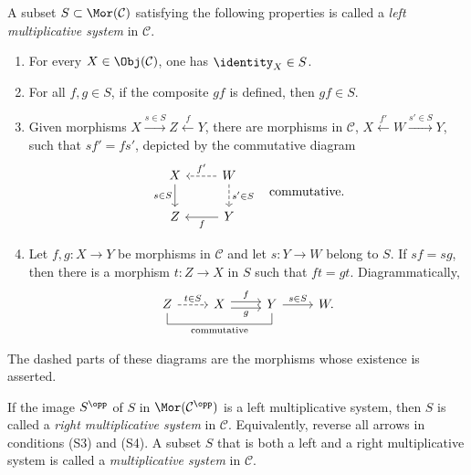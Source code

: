 \begin{definition}\label{def:multiplicative-family}
	A subset $S\subset\Mor(\mathcal{C})$ satisfying the following properties
	is called a \emph{left multiplicative system} in $\mathcal{C}$.
	\begin{enumerate}[(S1)]
		\item For every $X\in\Obj(\mathcal{C})$, one has $\identity_X\in S$.
		\item For all $f,g\in S$, if the composite $gf$ is defined, then
		$gf\in S$.
		\item Given morphisms
		$X\xrightarrow{s\in S}Z\xleftarrow{f}Y$, there are morphisms in
		$\mathcal{C}$, $X\xleftarrow{f'}W\xrightarrow{s'\in S}Y$, such that
		$sf'=fs'$, depicted by the commutative diagram
		\[\begin{tikzcd}
			X \arrow[d, "{s \in S}"'] & W \arrow[dashed, l, "{f'}"'] \arrow[dashed, d, "{s' \in S}"] \\
			Z & Y \arrow[l, "f"]
		\end{tikzcd} \quad \text{commutative}. \]
		\item Let $f,g:X\to Y$ be morphisms in $\mathcal{C}$ and let
		$s:Y\to W$ belong to $S$. If $sf=sg$, then there is a morphism
		$t:Z\to X$ in $S$ such that $ft=gt$. Diagrammatically,
		\[\begin{tikzcd}
			Z \arrow[dashed, r, "t \in S"] \arrow[dash, rr, "\text{commutative}"', to path={ -- ([yshift=-2ex]\tikztostart.south) -- ([yshift=-2ex]\tikztotarget.south) [midway]\tikztonodes -- (\tikztotarget)}] & X \arrow[r, shift left, "f"] \arrow[r, shift right, "g"'] & Y \arrow[r, "s \in S"] & W .
		\end{tikzcd}\]
	\end{enumerate}
	The dashed parts of these diagrams are the morphisms whose existence is
	asserted.

	If the image $S^{\opp}$ of $S$ in $\Mor(\mathcal{C}^{\opp})$ is a left
	multiplicative system, then $S$ is called a \emph{right multiplicative
	system} in $\mathcal{C}$. Equivalently, reverse all arrows in conditions
	(S3) and (S4). A subset $S$ that is both a left and a right multiplicative
	system is called a \emph{multiplicative system} in $\mathcal{C}$.
\end{definition}

